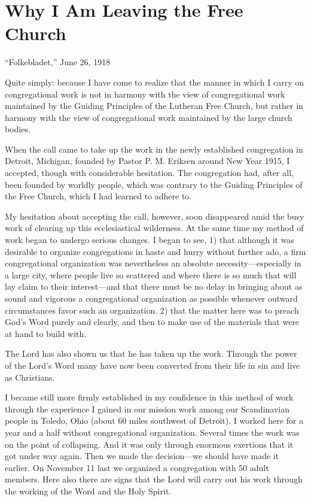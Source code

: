 
\section{Why I Am Leaving the Free Church}

“Folkebladet,” June 26, 1918

Quite simply: because I have come to realize that the manner in which I carry on congregational work is not in harmony with the view of congregational work maintained by the Guiding Principles of the Lutheran Free Church, but rather in harmony with the view of congregational work maintained by the large church bodies.

When the call came to take up the work in the newly established congregation in Detroit, Michigan, founded by Pastor P. M. Eriksen around New Year 1915, I accepted, though with considerable hesitation. The congregation had, after all, been founded by worldly people, which was contrary to the Guiding Principles of the Free Church, which I had learned to adhere to.

My hesitation about accepting the call, however, soon disappeared amid the busy work of clearing up this ecclesiastical wilderness. At the same time my method of work began to undergo serious changes. I began to see, 1) that although it was desirable to organize congregations in haste and hurry without further ado, a firm congregational organization was nevertheless an absolute necessity—especially in a large city, where people live so scattered and where there is so much that will lay claim to their interest—and that there must be no delay in bringing about as sound and vigorous a congregational organization as possible whenever outward circumstances favor such an organization. 2) that the matter here was to preach God’s Word purely and clearly, and then to make use of the materials that were at hand to build with.

The Lord has also shown us that he has taken up the work. Through the power of the Lord’s Word many have now been converted from their life in sin and live as Christians.

I became still more firmly established in my confidence in this method of work through the experience I gained in our mission work among our Scandinavian people in Toledo, Ohio (about 60 miles southwest of Detroit). I worked here for a year and a half without congregational organization. Several times the work was on the point of collapsing. And it was only through enormous exertions that it got under way again. Then we made the decision—we should have made it earlier. On November 11 last we organized a congregation with 50 adult members. Here also there are signs that the Lord will carry out his work through the working of the Word and the Holy Spirit.


